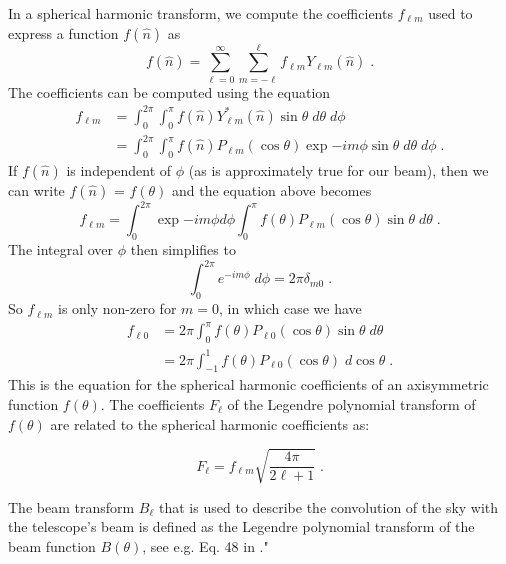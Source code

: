 In a spherical harmonic transform, we compute the coefficients $f_{\ell m}$ used to express a function $f (\hat{n})$ as
\begin{equation}
    f(\hat{n}) = \sum_{\ell=0}^{\infty}\sum_{m=-\ell}^{\ell}f_{\ell m} Y_{\ell m}(\hat{n}) \; .
\end{equation} 
The coefficients can be computed using the equation 
\begin{subequations}
\begin{align}
    f_{\ell m} &= \int_{0}^{2\pi}\int_{0}^{\pi} f(\hat{n}) Y_{\ell m}^{*}(\hat{n})\sin\theta \; d\theta\; d\phi   \\
    & = \int_{0}^{2\pi}\int_{0}^{\pi} f(\hat{n}) P_{\ell m}(\cos\theta)\exp{-im\phi} \sin\theta\; d\theta\; d\phi \; .
\end{align}
\end{subequations}
If $f (\hat{n})$ is independent of $\phi$ (as is approximately true for our beam), then we can write $f (\hat{n})$ = $f (\theta)$ and the equation above becomes
\begin{equation}
    f_{\ell m}= \int_{0}^{2\pi}\exp{-im\phi}d\phi\int_{0}^{\pi} f(\theta) P_{\ell m}(\cos\theta) \sin\theta\; d\theta \; .
\end{equation}
The integral over $\phi$ then simplifies to 
\begin{equation}
    \int_0^{2\pi} e^{-im\phi}\; d\phi = 2\pi \delta_{m0}\; .
\end{equation}
So $f_{\ell m}$ is only non-zero for $m=0$, in which case we have 
\begin{subequations}
\begin{align}
    f_{\ell 0} & =  2\pi\int_0^{\pi}f(\theta)P_{\ell 0}(\cos\theta)\sin\theta \; d\theta\\
    & = 2\pi \int_{-1}^{1}f(\theta)P_{\ell 0} (\cos\theta) \; d\cos \theta\; .
\end{align}
\end{subequations}
This is the equation for the spherical harmonic coefficients of an axisymmetric function $f(\theta)$. The coefficients $F_\ell$ of the Legendre polynomial transform of $f(\theta)$ are related to the spherical harmonic coefficients as:

\begin{equation}
    F_\ell = f_{\ell m} \sqrt{\frac{4\pi}{2\ell+1}}\; .
\end{equation}

The beam transform $B_\ell$ that is used to describe the convolution of the sky with the telescope’s beam is defined as the Legendre polynomial transform of the beam function $B(\theta)$, see e.g. Eq. 48 in \cite{challinor_2000}."
